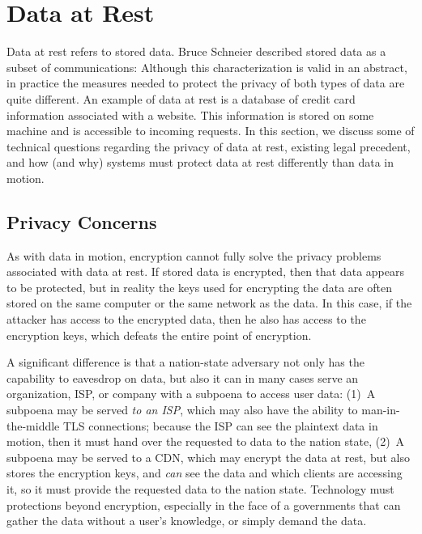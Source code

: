 \section{Data at Rest}
\label{sec:rest}

Data at rest refers to stored data. Bruce Schneier described stored data as a
subset of communications:  Although
this characterization is valid in an abstract, in practice the measures needed
to protect the privacy of both types of data are quite different.  An example
of data at rest is a database of credit card information associated with a
website. This information is stored on some machine and is accessible to
incoming requests. In this section, we discuss some of technical questions
regarding the privacy of data at rest, existing legal precedent, and how (and
why) systems must protect data at rest differently than data in motion.

\subsection{Privacy Concerns}  

As with data in motion, encryption cannot fully solve the privacy problems
associated with data at rest.  If stored data is encrypted, then that data
appears to be protected, but in reality the keys used for encrypting the data
are often stored on the same computer or the same network as the data.  In
this case, if the attacker has access to the encrypted data, then he also has
access to the encryption keys, which defeats the entire point of encryption.

A significant difference is that a nation-state adversary not only has the
capability to eavesdrop on data, but also it can in many cases serve an
organization, ISP, or company with a subpoena to access user data: (1)~A
subpoena may be served {\em to an ISP}, which may also have the ability to
man-in-the-middle TLS connections; because the ISP can see the plaintext data
in motion, then it must hand over the requested to data to the nation state,
(2)~A subpoena may be served to a CDN, which may encrypt the data at rest, but
also stores the encryption keys, and {\it can} see the data and which clients
are accessing it, so it must provide the requested data to the nation state.
Technology must protections beyond encryption, especially in the face of a
governments that can gather the data without a user's knowledge, or simply
demand the data.

